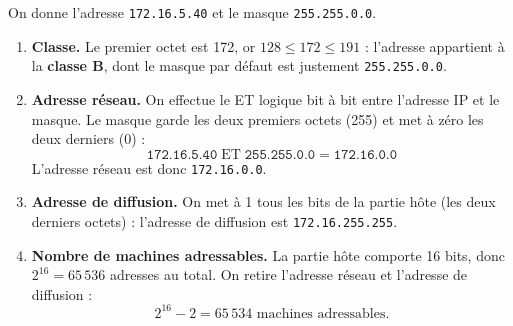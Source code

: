 \documentclass[11pt]{article}
\begin{document}
\begin{corrige}
On donne l'adresse \texttt{172.16.5.40} et le masque \texttt{255.255.0.0}.
\begin{enumerate}
\item \textbf{Classe.} Le premier octet est 172, or $128 \leq 172 \leq 191$ : l'adresse appartient à la \textbf{classe B}, dont le masque par défaut est justement \texttt{255.255.0.0}.
\item \textbf{Adresse réseau.} On effectue le ET logique bit à bit entre l'adresse IP et le masque. Le masque garde les deux premiers octets (255) et met à zéro les deux derniers (0) :
\[ \texttt{172.16.5.40} \;\mathrm{ET}\; \texttt{255.255.0.0} = \texttt{172.16.0.0} \]
L'adresse réseau est donc \texttt{172.16.0.0}.
\item \textbf{Adresse de diffusion.} On met à 1 tous les bits de la partie hôte (les deux derniers octets) : l'adresse de diffusion est \texttt{172.16.255.255}.
\item \textbf{Nombre de machines adressables.} La partie hôte comporte 16 bits, donc $2^{16} = 65\,536$ adresses au total. On retire l'adresse réseau et l'adresse de diffusion :
\[ 2^{16} - 2 = 65\,534 \text{ machines adressables.} \]
\end{enumerate}
\end{corrige}
\end{document}
